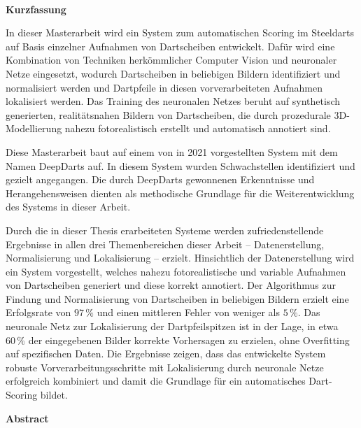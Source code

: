 
\mbox{~}
\newpage

\vspace*{2.17cm}

{\noindent\Huge\textbf{Kurzfassung}}

\vspace*{1.405cm}

\noindent In dieser Masterarbeit wird ein System zum automatischen Scoring im Steeldarts auf Basis einzelner Aufnahmen von Dartscheiben entwickelt. Dafür wird eine Kombination von Techniken herkömmlicher Computer Vision und neuronaler Netze eingesetzt, wodurch Dartscheiben in beliebigen Bildern identifiziert und normalisiert werden und Dartpfeile in diesen vorverarbeiteten Aufnahmen lokalisiert werden. Das Training des neuronalen Netzes beruht auf synthetisch generierten, realitätsnahen Bildern von Dartscheiben, die durch prozedurale 3D-Modellierung nahezu fotorealistisch erstellt und automatisch annotiert sind.

Diese Masterarbeit baut auf einem von \citeauthor{deepdarts} in 2021 vorgestellten System mit dem Namen DeepDarts auf. In diesem System wurden Schwachstellen identifiziert und gezielt angegangen. Die durch DeepDarts gewonnenen Erkenntnisse und Herangehensweisen dienten als methodische Grundlage für die Weiterentwicklung des Systems in dieser Arbeit.

Durch die in dieser Thesis erarbeiteten Systeme werden zufriedenstellende Ergebnisse in allen drei Themenbereichen dieser Arbeit -- Datenerstellung, Normalisierung und Lokalisierung -- erzielt. Hinsichtlich der Datenerstellung wird ein System vorgestellt, welches nahezu fotorealistische und variable Aufnahmen von Dartscheiben generiert und diese korrekt annotiert. Der Algorithmus zur Findung und Normalisierung von Dartscheiben in beliebigen Bildern erzielt eine Erfolgsrate von $97\,\%$ und einen mittleren Fehler von weniger als $5\,\%$. Das neuronale Netz zur Lokalisierung der Dartpfeilspitzen ist in der Lage, in etwa $60\,\%$ der eingegebenen Bilder korrekte Vorhersagen zu erzielen, ohne Overfitting auf spezifischen Daten. Die Ergebnisse zeigen, dass das entwickelte System robuste Vorverarbeitungsschritte mit Lokalisierung durch neuronale Netze erfolgreich kombiniert und damit die Grundlage für ein automatisches Dart-Scoring bildet.

\newpage

\vspace*{2.17cm}

{\noindent\Huge\textbf{Abstract}}

